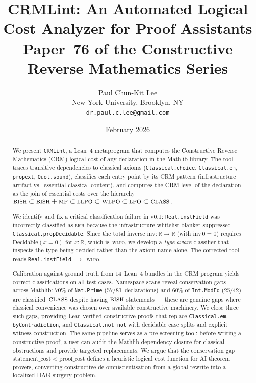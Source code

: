 \documentclass[12pt, a4paper]{article}
\title{CRMLint: An Automated Logical Cost Analyzer for Proof Assistants\\
  \large Paper~76 of the Constructive Reverse Mathematics Series}
\author{Paul Chun-Kit Lee\\
  \small New York University, Brooklyn, NY\\
  \small \texttt{dr.paul.c.lee@gmail.com}}
\date{February 2026}
\theoremstyle{plain}
\theoremstyle{definition}
\theoremstyle{remark}
\newcommand{\BISH}{\textsc{bish}}
\newcommand{\BISHMP}{\textsc{bish\,+\,mp}}
\newcommand{\LLPO}{\textsc{llpo}}
\newcommand{\WLPO}{\textsc{wlpo}}
\newcommand{\LPO}{\textsc{lpo}}
\newcommand{\CLASS}{\textsc{class}}
\newcommand{\CRMLint}{\texttt{CRMLint}}
\begin{document}
\maketitle

\begin{abstract}
We present \CRMLint, a Lean~4 metaprogram that computes the
Constructive Reverse Mathematics (CRM) logical cost of any
declaration in the Mathlib library.
The tool traces transitive dependencies to classical axioms
(\texttt{Classical.choice}, \texttt{Classical.em}, \texttt{propext},
\texttt{Quot.sound}), classifies each entry point by its CRM pattern
(infrastructure artifact vs.\ essential classical content), and
computes the CRM level of the declaration as the join of essential
costs over the hierarchy
$\BISH \subset \BISHMP \subset \LLPO \subset \WLPO \subset \LPO \subset \CLASS$.

We identify and fix a critical classification failure in v0.1:
\texttt{Real.instField} was incorrectly classified as \BISH{}
because the infrastructure whitelist blanket-suppressed
\texttt{Classical.propDecidable}. Since the total inverse
$\mathrm{inv} : \mathbb{R} \to \mathbb{R}$ (with $\mathrm{inv}\,0 = 0$)
requires $\mathrm{Decidable}(x = 0)$ for $x : \mathbb{R}$, which
is~\WLPO, we develop a \emph{type-aware} classifier that
inspects the type being decided rather than the axiom name alone.
The corrected tool reads \texttt{Real.instField}~$\to$~\WLPO.

Calibration against ground truth from 14~Lean~4 bundles in the
CRM program yields correct classifications on all test cases.
Namespace scans reveal conservation gaps across Mathlib:
70\% of \texttt{Nat.Prime} (57/81~declarations) and 60\% of
\texttt{Int.ModEq} (25/42) are classified~$\CLASS$ despite having
$\BISH$ statements --- these are genuine gaps where classical
convenience was chosen over available constructive machinery.
We close three such gaps, providing Lean-verified constructive
proofs that replace \texttt{Classical.em}, \texttt{byContradiction},
and \texttt{Classical.not\_not} with decidable case splits and
explicit witness construction.  The same pipeline serves as a
pre-screening tool: before writing a constructive proof, a user
can audit the Mathlib dependency closure for classical obstructions
and provide targeted replacements.  We argue that the conservation
gap $\mathrm{statement\_cost} < \mathrm{proof\_cost}$ defines a
heuristic logical cost function for AI theorem provers, converting
constructive de-omniscientisation from a global rewrite into a
localized DAG surgery problem.
\end{abstract}
\end{document}
